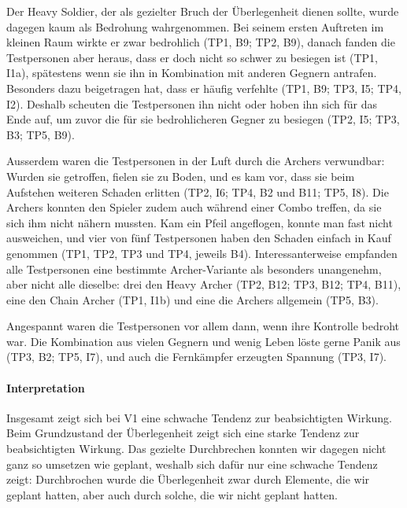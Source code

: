 \documentclass[../Main.tex]{subfiles}
\begin{document}
Der Heavy Soldier, der als gezielter Bruch der Überlegenheit dienen sollte, wurde dagegen kaum als Bedrohung wahrgenommen. Bei seinem ersten Auftreten im kleinen Raum wirkte er zwar bedrohlich (TP1, B9; TP2, B9), danach fanden die Testpersonen aber heraus, dass er doch nicht so schwer zu besiegen ist (TP1, I1a), spätestens wenn sie ihn in Kombination mit anderen Gegnern antrafen. Besonders dazu beigetragen hat, dass er häufig verfehlte (TP1, B9; TP3, I5; TP4, I2). Deshalb scheuten die Testpersonen ihn nicht oder hoben ihn sich für das Ende auf, um zuvor die für sie bedrohlicheren Gegner zu besiegen (TP2, I5; TP3, B3; TP5, B9).

Ausserdem waren die Testpersonen in der Luft durch die Archers verwundbar: Wurden sie getroffen, fielen sie zu Boden, und es kam vor, dass sie beim Aufstehen weiteren Schaden erlitten (TP2, I6; TP4, B2 und B11; TP5, I8). Die Archers konnten den Spieler zudem auch während einer Combo treffen, da sie sich ihm nicht nähern mussten. Kam ein Pfeil angeflogen, konnte man fast nicht ausweichen, und vier von fünf Testpersonen haben den Schaden einfach in Kauf genommen (TP1, TP2, TP3 und TP4, jeweils B4). Interessanterweise empfanden alle Testpersonen eine bestimmte Archer-Variante als besonders unangenehm, aber nicht alle dieselbe: drei den Heavy Archer (TP2, B12; TP3, B12; TP4, B11), eine den Chain Archer (TP1, I1b) und eine die Archers allgemein (TP5, B3).

Angespannt waren die Testpersonen vor allem dann, wenn ihre Kontrolle bedroht war. Die Kombination aus vielen Gegnern und wenig Leben löste gerne Panik aus (TP3, B2; TP5, I7), und auch die Fernkämpfer erzeugten Spannung (TP3, I7).

\paragraph{Interpretation}
Insgesamt zeigt sich bei V1 eine schwache Tendenz zur beabsichtigten Wirkung. Beim Grundzustand der Überlegenheit zeigt sich eine starke Tendenz zur beabsichtigten Wirkung. Das gezielte Durchbrechen konnten wir dagegen nicht ganz so umsetzen wie geplant, weshalb sich dafür nur eine schwache Tendenz zeigt: Durchbrochen wurde die Überlegenheit zwar durch Elemente, die wir geplant hatten, aber auch durch solche, die wir nicht geplant hatten.
\end{document}
